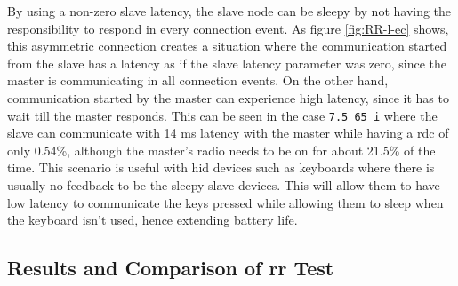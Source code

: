 By using a non-zero slave latency, the slave node can be sleepy by not having the responsibility to respond in every connection event. As figure \ref{fig:RR-l-ec} shows, this asymmetric connection creates a situation where the communication started from the slave has a latency as if the slave latency parameter was zero, since the master is communicating in all connection events. On the other hand, communication started by the master can experience high latency, since it has to wait till the master responds. This can be seen in the case \texttt{7.5\_65\_i} where the slave can communicate with 14 ms latency with the master while having a \gls{rdc} of only 0.54\%, although the master's radio needs to be on for about 21.5\% of the time. This scenario is useful with \gls{hid} devices such as keyboards where there is usually no feedback to be the sleepy slave devices. This will allow them to have low latency to communicate the keys pressed while allowing them to sleep when the keyboard isn't used, hence extending battery life.
%
%

\subsection{Results and Comparison of \texorpdfstring{\acrlong{rr}}{Request-Response} Test}

